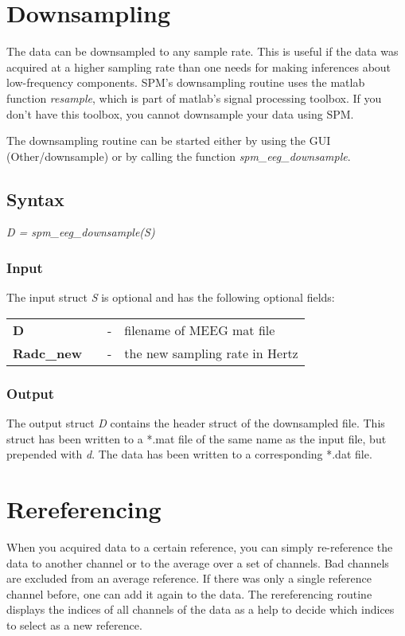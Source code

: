 \section{Downsampling}
The data can be downsampled to any sample rate. This is useful if the
data was acquired at a higher sampling rate than one needs for
making inferences about low-frequency components. SPM's downsampling
routine uses the matlab function {\it resample}, which is part of
matlab's signal processing toolbox. If you don't have this toolbox, you cannot
downsample your data using SPM. 

The downsampling routine can be started either by using the GUI
(Other/downsample) or by calling the function
\textit{spm\_eeg\_downsample}.

\subsection{Syntax}
\textit{D = spm\_eeg\_downsample(S)}
\\

\subsubsection{Input}
The input struct {\it S} is optional and has the following optional fields:

\begin{tabular}{llcp{9cm}}
{\bf D} & & - & filename of MEEG mat file\\
{\bf Radc\_new} &  & - & the new sampling rate in Hertz
\end{tabular}

\subsubsection{Output}
The output struct {\it D} contains the header struct of the downsampled
file. This struct has been written to a *.mat file of the same name as
the input file, but prepended with {\it d}. The data has been
written to a corresponding *.dat file.

\section{Rereferencing}
When you acquired data to a certain reference, you can simply
re-reference the data to another channel or to the average over a set
of channels. Bad channels are excluded from an average reference. If
there was only a single reference channel before, one can add it again
to the data. The rereferencing routine displays the indices of all
channels of the data as a help to decide which indices to select as a
new reference.

